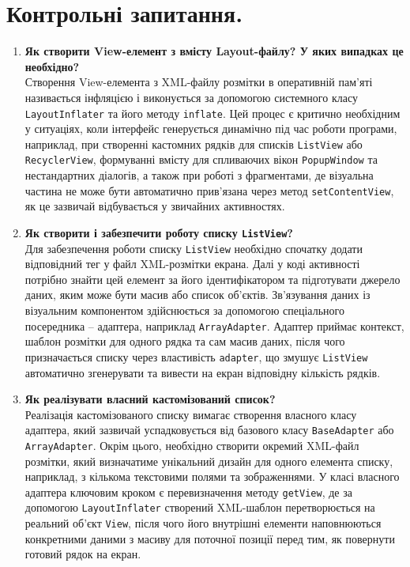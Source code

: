 \documentclass[14pt, a4paper]{extreport}
\begin{document}
	\section*{Контрольні запитання.}
	
	\begin{enumerate}
		\item \textbf{Як створити View-елемент з вмісту Layout-файлу? У яких випадках це необхідно?} \\ Створення View-елемента з XML-файлу розмітки в оперативній пам'яті називається інфляцією і виконується за допомогою системного класу \texttt{LayoutInflater} та його методу \texttt{inflate}. Цей процес є критично необхідним у ситуаціях, коли інтерфейс генерується динамічно під час роботи програми, наприклад, при створенні кастомних рядків для списків \texttt{ListView} або \texttt{RecyclerView}, формуванні вмісту для спливаючих вікон \texttt{PopupWindow} та нестандартних діалогів, а також при роботі з фрагментами, де візуальна частина не може бути автоматично прив'язана через метод \texttt{setContentView}, як це зазвичай відбувається у звичайних активностях.
		
		\item \textbf{Як створити і забезпечити роботу списку \texttt{ListView}?} \\ Для забезпечення роботи списку \texttt{ListView} необхідно спочатку додати відповідний тег у файл XML-розмітки екрана. Далі у коді активності потрібно знайти цей елемент за його ідентифікатором та підготувати джерело даних, яким може бути масив або список об'єктів. Зв'язування даних із візуальним компонентом здійснюється за допомогою спеціального посередника -- адаптера, наприклад \texttt{ArrayAdapter}. Адаптер приймає контекст, шаблон розмітки для одного рядка та сам масив даних, після чого призначається списку через властивість \texttt{adapter}, що змушує \texttt{ListView} автоматично згенерувати та вивести на екран відповідну кількість рядків.
		
		\item \textbf{Як реалізувати власний кастомізований список?} \\ Реалізація кастомізованого списку вимагає створення власного класу адаптера, який зазвичай успадковується від базового класу \texttt{BaseAdapter} або \texttt{ArrayAdapter}. Окрім цього, необхідно створити окремий XML-файл розмітки, який визначатиме унікальний дизайн для одного елемента списку, наприклад, з кількома текстовими полями та зображеннями. У класі власного адаптера ключовим кроком є перевизначення методу \texttt{getView}, де за допомогою \texttt{LayoutInflater} створений XML-шаблон перетворюється на реальний об'єкт \texttt{View}, після чого його внутрішні елементи наповнюються конкретними даними з масиву для поточної позиції перед тим, як повернути готовий рядок на екран.
		

\end{enumerate}
\end{document}
